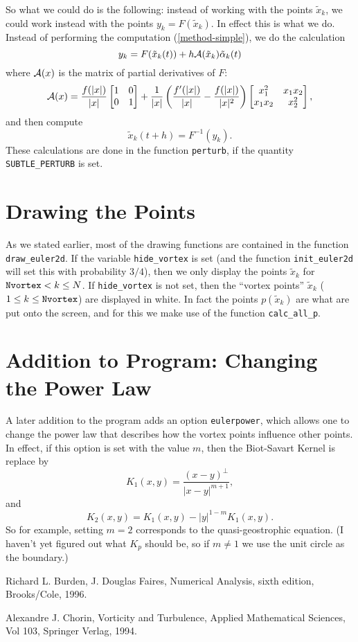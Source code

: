 \documentclass[12pt]{article}
\begin{document}
So what we could do is the following: instead of working with
the points $\tilde x_k$, we could work instead with the points
$y_k = F(\tilde x_k)$.  In effect this is what we do.
Instead of performing the computation (\ref{method-simple}),
we do the calculation
\begin{equation*}
y_k = F(\tilde x_k(t)) + h {\cal A}(\tilde x_k) \tilde\alpha_k(t) 
\end{equation*}
where
${\cal A}(x)$ is the matrix of partial derivatives of $F$:
\begin{equation*}
{\cal A}(x) = 
\frac{f(|x|)}{|x|}
\left[
\begin{matrix}
1 & 0\\
0 & 1
\end{matrix}
\right]
+ \frac1{|x|}
  \left(\frac{f'(|x|)}{|x|} - \frac{f(|x|)}{|x|^2}\right)
\left[
\begin{matrix}
x_{1}^2   & x_{1} x_{2}\\
x_{1} x_{2} & x_{2}^2
\end{matrix}
\right],
\end{equation*}
and then compute
\begin{equation*}
\tilde x_k(t+h) = F^{-1}(y_k).
\end{equation*}
These calculations are done in the function {\tt perturb}, if
the quantity {\tt SUBTLE\_PERTURB} is set.

\section{Drawing the Points}

As we stated earlier, most of the drawing functions are contained
in the function {\tt draw\_euler2d}.  If the variable 
{\tt hide\_vortex} is set (and the function {\tt init\_euler2d}
will set this with probability $3/4$), then we only display
the points $\tilde x_k$ for ${\tt Nvortex} < k \le N$.  If 
{\tt hide\_vortex} is not set, then the ``vortex points''
$\tilde x_k$ ($1 \le k \le {\tt Nvortex}$) are displayed in white.
In fact the points $p(\tilde x_k)$ are what are put onto the screen,
and for this we make use of the function {\tt calc\_all\_p}.

\section{Addition to Program: Changing the Power Law}

A later addition to the program adds an option {\tt eulerpower},
which allows one to change the power law that describes how
the vortex points influence other points.  In effect, if this
option is set with the value $m$, then the Biot-Savart Kernel
is replace by
$$ K_1(x,y) = \frac{(x-y)^\perp}{|x-y|^{m+1}}, $$
and
$$ K_2(x,y) = K_1(x,y) - |y|^{1-m} K_1(x,y) .$$
So for example, setting $m=2$ corresponds to the 
quasi-geostrophic equation.  (I haven't yet figured out
what $K_p$ should be, so if $m \ne 1$ we use the unit circle
as the boundary.)

\begin{thebibliography}{9}

 Richard L. Burden, J. Douglas Faires, Numerical Analysis,
sixth edition, Brooks/Cole, 1996.

 Alexandre J. Chorin, Vorticity and Turbulence,
Applied Mathematical Sciences, Vol 103, Springer Verlag, 1994.

\end{thebibliography}
\end{document}
